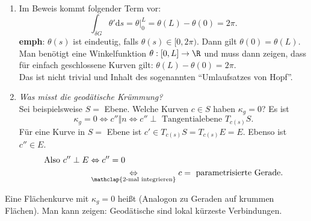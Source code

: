 \begin{remark}
  \
  \begin{enumerate}
    \item Im Beweis kommt folgender Term vor:
    \begin{equation*}
      \int_{\delta G}\theta' \text{d}s = \theta \vert_0^L = \theta(L) - \theta(0) = 2\pi\text{.}
    \end{equation*}
    \textbf{emph}: \( \theta(s) \) ist eindeutig, falls \( \theta(s) \in [0,2\pi) \). Dann gilt \( \theta(0) = \theta(L) \). \\
    Man benötigt eine Winkelfunktion \( \theta: [0,L] \to \R \) und muss dann zeigen, dass für einfach geschlossene Kurven gilt: \( \theta(L) - \theta(0) = 2\pi \). \\
    Das ist nicht trivial und Inhalt des sogenannten ``Umlaufsatzes von Hopf''.

    \item \emph{Was misst die geodätische Krümmung?} \\
    Sei beispielsweise \( S = \) Ebene. Welche Kurven \( c \in S \) haben \( \kappa_g = 0 \)? Es ist
    \begin{equation*}
      \kappa_g = 0 \Leftrightarrow c'' \Vert n \Leftrightarrow c'' \perp \text{ Tangentialebene } T_{c(s)}S\text{.}
    \end{equation*}
    Für eine Kurve in \( S = \) Ebene ist \( c' \in T_{c(s)}S = T_{c(s)}E = E \). Ebenso ist \( c'' \in E \).
    \begin{align*}
      \text{Also } c'' \perp E &\Leftrightarrow c'' = 0 \\
       &\underset{\mathclap{\text{2-mal integrieren}}}{\Leftrightarrow} c = \text{ parametrisierte Gerade.}
    \end{align*}
  \end{enumerate}  
\end{remark}

\begin{definition}[Geodätische]
  Eine Flächenkurve mit \( \kappa_g = 0 \) heißt \label{def:geodaetische} (Analogon zu Geraden auf krummen Flächen). Man kann zeigen: Geodätische sind lokal kürzeste Verbindungen.
\end{definition}

